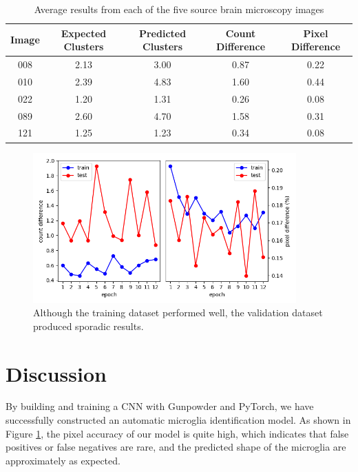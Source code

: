 \documentclass{article}
\begin{document}
\begin{table}[ht]
  \captionsetup{width=\textwidth}
  \caption{Average results from each of the five source brain microscopy images}
  \label{tbl:img-summary}
  \centering
  \begin{tabular}{ccccc}
    \toprule
    Image & Expected Clusters & Predicted Clusters & Count Difference & Pixel Difference \\
    \midrule
    008 & 2.13 & 3.00 & 0.87 & 0.22 \\
    010 & 2.39 & 4.83 & 1.60 & 0.44 \\
    022 & 1.20 & 1.31 & 0.26 & 0.08 \\
    089 & 2.60 & 4.70 & 1.58 & 0.31 \\
    121 & 1.25 & 1.23 & 0.34 & 0.08 \\
    \bottomrule
  \end{tabular}
\end{table}

\begin{figure}[ht]
  \centering
  \includegraphics[width=0.9\textwidth]{epoch_summary_to_epoch12.png}
  \captionsetup{width=0.9\textwidth}
  \caption{Although the training dataset performed well, the validation 
  dataset produced sporadic results.}
  \label{fig:epoch-summary}
\end{figure}

\section{Discussion}

By building and training a CNN with Gunpowder and PyTorch, we have 
successfully constructed an automatic microglia identification model. As 
shown in Figure \ref{fig:epoch-summary}, the pixel accuracy of our model is 
quite high, which indicates that false positives or false negatives are rare, 
and the predicted shape of the microglia are approximately as expected.
\end{document}

